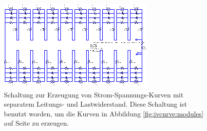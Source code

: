 \begin{figure}[h!tb]
    \centering
    \includegraphics[angle=90,width=\textwidth]{images/ltspice/module-string-complete.eps}
    \caption{%
        Schaltung  zur  Erzeugung  von  Strom-Spannungs-Kurven  mit  separatem
        Leitungs-  und  Lastwiderstand. Diese  Schaltung ist  benutzt  worden,
        um  die  Kurven  in   Abbildung  \ref{fig:ivcurve:modules}  auf  Seite
        \pageref{fig:ivcurve:modules} zu erzeugen.%
    }
    \label{fig:ltspice:vicurvesimulator:modules}
\end{figure}

